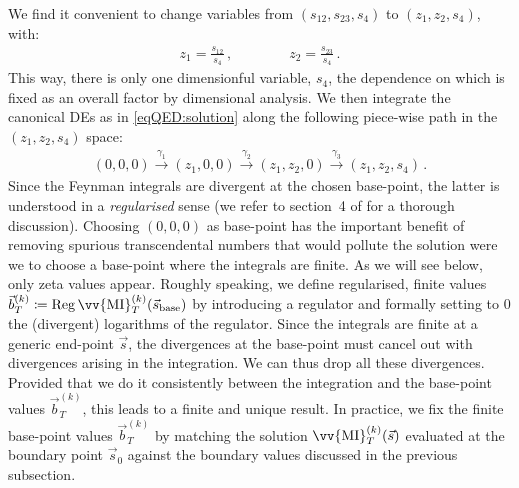 \documentclass[main.tex]{subfiles}
\begin{document}
We find it convenient to change variables from $(s_{12},s_{23},s_4)$ to $(z_1,z_2,s_4)$, with:
\begin{align}
z_1 = \frac{s_{12}}{s_4} \,, \qquad \qquad z_2 = \frac{s_{23}}{s_4} \,.
\end{align}
This way, there is only one dimensionful variable, $s_4$, the dependence on which is fixed as an overall factor by dimensional analysis.
We then integrate the canonical DEs as in \cref{eqQED:solution} along the following piece-wise path in the $(z_1,z_2,s_4)$ space:
\begin{align} \label{eqQED:path}
(0,0,0) \overset{\gamma_1}{\longrightarrow} (z_1, 0, 0)  \overset{\gamma_2}{\longrightarrow} (z_1, z_2, 0)  \overset{\gamma_3}{\longrightarrow} (z_1, z_2, s_4) \,.
\end{align}
Since the Feynman integrals are divergent at the chosen base-point, the latter is understood in a \emph{regularised} sense (we refer to section~4 of  for a thorough discussion).
Choosing $(0,0,0)$ as base-point has the important benefit of removing spurious transcendental numbers that would pollute the solution were we to choose a base-point where the integrals are finite. As we will see below, only zeta values appear.
Roughly speaking, we define regularised, finite values $\vec{b}^{(k)}_{T} \coloneqq \mathrm{Reg} \, \vv{\text{MI}}_T^{(k)}(\vec{s}_{\mathrm{base}})$ by introducing a regulator and formally setting to $0$ the (divergent) logarithms of the regulator.
Since the integrals are finite at a generic end-point $\vec{s}$, the divergences at the base-point must cancel out with divergences arising in the integration. We can thus drop all these divergences. Provided that we do it consistently between the integration and the base-point values $\vec{b}^{(k)}_{T}$, this leads to a finite and unique result. In practice, we fix the finite base-point values $\vec{b}^{(k)}_{T}$ by matching the solution $\vv{\text{MI}}_T^{(k)}(\vec{s})$ evaluated at the boundary point $\vec{s}_0$ against the boundary values discussed in the previous subsection. 
\end{document}
